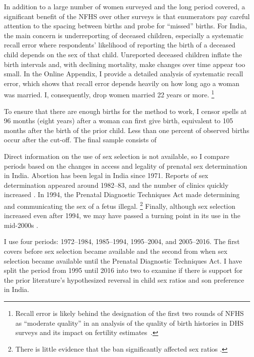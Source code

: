 \documentclass[12pt,letterpaper]{article}
\begin{document}
In addition to a large number of women surveyed and the long period covered, a significant 
benefit of the NFHS over other surveys is that enumerators pay careful attention to the 
spacing between births and probe for ``missed'' births.
For India, the main concern is underreporting of deceased children, especially a systematic 
recall error where respondents' likelihood of reporting the birth of a deceased child depends 
on the sex of that child.
Unreported deceased children inflate the birth intervals and, with declining mortality, 
make changes over time appear too small.
In the Online Appendix, I provide a detailed analysis of systematic recall error, which 
shows that recall error depends heavily on how long ago a woman was married. 
I, consequently, drop women married 22 years or more.%
\footnote{
Recall error is likely behind the designation of the first two rounds of NFHS as ``moderate 
quality'' in an analysis of the quality of birth histories in DHS surveys and its impact 
on fertility estimates \citep{Schoumaker2014}.
}

To ensure that there are enough births for the method to work, I censor spells at 96 
months (eight years) after a woman can first give birth, equivalent to 105 months 
after the birth of the prior child.
Less than one percent of observed births occur after the cut-off.
The final sample consists of 


% 

Direct information on the use of sex selection is not available, so I compare periods 
based on the changes in access and legality of prenatal sex determination in India.
Abortion has been legal in India since 1971.
Reports of sex determination appeared around 1982--83, and the number of clinics 
quickly increased \citep{Sudha1999,bhat06,Grover2006}.
In 1994, the Prenatal Diagnostic Techniques Act made determining and communicating 
the sex of a fetus illegal.%
\footnote{
There is little evidence that the ban significantly affected sex ratios \citep{Das-Gupta2016}.
}
Finally, although sex selection increased even after 1994, we may have passed a 
turning point in its use in the mid-2000s \citep{Das_Gupta2009,Kumar2012,Bongaarts2013,Diamond-Smith2015}.

I use four periods: 1972--1984, 1985--1994, 1995--2004, and 2005--2016.
The first covers before sex selection became available and the second from when sex 
selection became available until the Prenatal Diagnostic Techniques Act.
I have split the period from 1995 until 2016 into two to examine if there is support for 
the prior literature's hypothesized reversal in child sex ratios and son 
preference in India.
\end{document}
